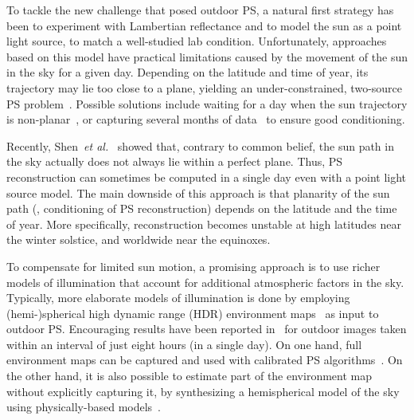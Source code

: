 To tackle the new challenge that posed outdoor PS, a natural first strategy has been to experiment with Lambertian reflectance and to model the sun as a point light source, to match a well-studied lab condition. Unfortunately, approaches based on this model have practical limitations caused by the movement of the sun in the sky for a given day. Depending on the latitude and time of year, its trajectory may lie too close to a plane, yielding an under-constrained, two-source PS problem~\cite{hernandez-pami-11}. Possible solutions include waiting for a day when the sun trajectory is non-planar~\cite{shen-pg-14}, or capturing several months of data~\cite{ackermann-cvpr-12,abrams-eccv-12} to ensure good conditioning.

Recently, Shen~{\em et al.}~\cite{shen-pg-14} showed that, contrary to common belief, the sun path in the sky actually does not always lie within a perfect plane. Thus, PS reconstruction can sometimes be computed in a single day even with a point light source model. The main downside of this approach is that planarity of the sun path (\ie, conditioning of PS reconstruction) depends on the latitude and the time of year. More specifically, reconstruction becomes unstable at high latitudes near the winter solstice, and worldwide near the equinoxes.

To compensate for limited sun motion, a promising approach is to use richer models of illumination that account for additional atmospheric factors in the sky. Typically, more elaborate models of illumination is done by employing (hemi-)spherical high dynamic range (HDR) environment maps~\cite{debevec-siggraph-98,reinhard-book-05} as input to outdoor PS. Encouraging results have been reported in~\cite{yu-iccp-13} for outdoor images taken within an interval of just eight hours (in a single day). On one hand, full environment maps can be captured and used with calibrated PS algorithms~\cite{yu-iccp-13,shi-3dv-14,hung-wacv-15}. On the other hand, it is also possible to estimate part of the environment map without explicitly capturing it, by synthesizing a hemispherical model of the sky using physically-based models~\cite{inose-tcva-13,jung-cvpr-15}.

